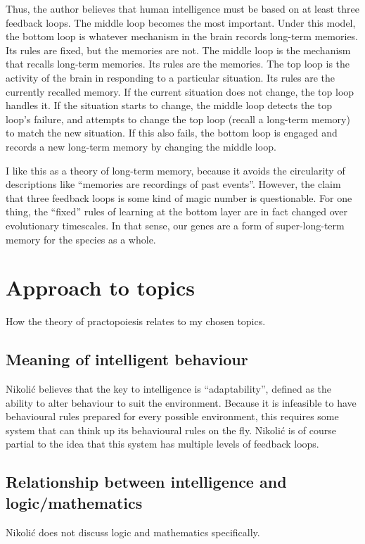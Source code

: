 \documentclass[10pt,a4paper]{article}
\newcommand{\nquote}[1]{``{#1}''}
\begin{document}
Thus, the author believes that human intelligence must be based on at least three feedback loops. The middle loop becomes the most important. Under this model, the bottom loop is whatever mechanism in the brain records long-term memories. Its rules are fixed, but the memories are not. The middle loop is the mechanism that recalls long-term memories. Its rules are the memories. The top loop is the activity of the brain in responding to a particular situation. Its rules are the currently recalled memory. If the current situation does not change, the top loop handles it. If the situation starts to change, the middle loop detects the top loop's failure, and attempts to change the top loop (recall a long-term memory) to match the new situation. If this also fails, the bottom loop is engaged and records a new long-term memory by changing the middle loop.

I like this as a theory of long-term memory, because it avoids the circularity of descriptions like \nquote{memories are recordings of past events}. However, the claim that three feedback loops is some kind of magic number is questionable. For one thing, the \nquote{fixed} rules of learning at the bottom layer are in fact changed over evolutionary timescales. In that sense, our genes are a form of super-long-term memory for the species as a whole.


\section{Approach to topics}
How the theory of practopoiesis relates to my chosen topics.

\subsection{Meaning of intelligent behaviour}
Nikoli{\'c} believes that the key to intelligence is \nquote{adaptability}, defined as the ability to alter behaviour to suit the environment. Because it is infeasible to have behavioural rules prepared for every possible environment, this requires some system that can think up its behavioural rules on the fly. Nikoli{\'c} is of course partial to the idea that this system has multiple levels of feedback loops.

\subsection{Relationship between intelligence and logic/mathematics}
Nikoli{\'c} does not discuss logic and mathematics specifically.
\end{document}
